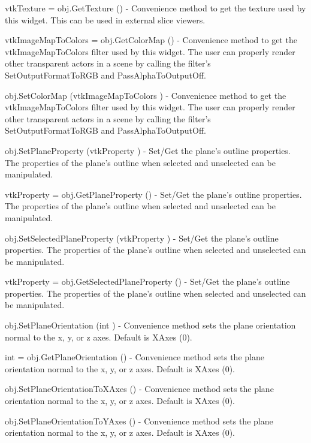 \begin{DoxyItemize}
\item {\ttfamily vtk\-Texture = obj.\-Get\-Texture ()} -\/ Convenience method to get the texture used by this widget. This can be used in external slice viewers.  
\item {\ttfamily vtk\-Image\-Map\-To\-Colors = obj.\-Get\-Color\-Map ()} -\/ Convenience method to get the vtk\-Image\-Map\-To\-Colors filter used by this widget. The user can properly render other transparent actors in a scene by calling the filter's Set\-Output\-Format\-To\-R\-G\-B and Pass\-Alpha\-To\-Output\-Off.  
\item {\ttfamily obj.\-Set\-Color\-Map (vtk\-Image\-Map\-To\-Colors )} -\/ Convenience method to get the vtk\-Image\-Map\-To\-Colors filter used by this widget. The user can properly render other transparent actors in a scene by calling the filter's Set\-Output\-Format\-To\-R\-G\-B and Pass\-Alpha\-To\-Output\-Off.  
\item {\ttfamily obj.\-Set\-Plane\-Property (vtk\-Property )} -\/ Set/\-Get the plane's outline properties. The properties of the plane's outline when selected and unselected can be manipulated.  
\item {\ttfamily vtk\-Property = obj.\-Get\-Plane\-Property ()} -\/ Set/\-Get the plane's outline properties. The properties of the plane's outline when selected and unselected can be manipulated.  
\item {\ttfamily obj.\-Set\-Selected\-Plane\-Property (vtk\-Property )} -\/ Set/\-Get the plane's outline properties. The properties of the plane's outline when selected and unselected can be manipulated.  
\item {\ttfamily vtk\-Property = obj.\-Get\-Selected\-Plane\-Property ()} -\/ Set/\-Get the plane's outline properties. The properties of the plane's outline when selected and unselected can be manipulated.  
\item {\ttfamily obj.\-Set\-Plane\-Orientation (int )} -\/ Convenience method sets the plane orientation normal to the x, y, or z axes. Default is X\-Axes (0).  
\item {\ttfamily int = obj.\-Get\-Plane\-Orientation ()} -\/ Convenience method sets the plane orientation normal to the x, y, or z axes. Default is X\-Axes (0).  
\item {\ttfamily obj.\-Set\-Plane\-Orientation\-To\-X\-Axes ()} -\/ Convenience method sets the plane orientation normal to the x, y, or z axes. Default is X\-Axes (0).  
\item {\ttfamily obj.\-Set\-Plane\-Orientation\-To\-Y\-Axes ()} -\/ Convenience method sets the plane orientation normal to the x, y, or z axes. Default is X\-Axes (0).  

\end{DoxyItemize}
